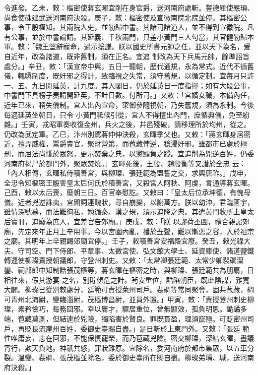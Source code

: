 \begin{pinyinscope}
 令進發。乙未，敕：樞密使蔣玄暉宜削在身官爵，送河南府處斬。豐德庫使應頊、尚食使硃建武送河南府決殺。庚子，敕：樞密使及宣徽南院北院並停。其樞密公事，令王殷權知。其兩院人吏，並勒歸中書。其諸司諸道人，並不得到宣徽院。凡有公事，並於中書論請。其延義、千秋兩門，只差小黃門三人勾當，其官健勒歸本軍。敕：「魏王堅辭寵命，過示捴謙。朕以國史所書元帥之任，並以天下為名，爰自近年，改為諸道，既非舊制，須在正名。宜追
 制改為天下兵馬元帥，餘準詔旨處分。」辛丑，敕：「漢宣帝中興，五日一聽朝，歷代通規，永為常式。近代不循舊儀，輒隳制度，既奸邪之得計，致臨視之失常，須守舊規，以循定制。宜每月只許一、五、九日開延英，計九度。其入閣日，仍於延英日一度指揮；如有大段公事，中書門下具榜子奏請開延英，不計日數。付所司。」又敕：「宮嬪女職，本備內任，近年已來，稍失儀制。宮人出內宣命，寀御參隨視朝，乃失舊規，須為永制。今後每遇延英坐朝日，只令
 小黃門祗候引從，宮人不得擅出內門，庶循典儀，免至紛雜。」壬寅，戎昭軍奏收復金州，兵火之後，井邑殘破，請移理所於均州，從之。仍改為武定軍。乙巳，汴州別駕蔣仲伸決殺，玄暉季父也。又敕：「蔣玄暉身居密近，擅弄威權，鬻爵賣官，聚財營第，而苞藏悖逆，稔浸奸邪。雖都市已處於極刑，而屈法尚慊於眾怒，更示焚棄之典，以懲顯負之蹤。宜追削為兇逆百姓，仍委河南府揭尸於都門外，聚眾焚燒。」玄暉死後，王殷、趙殷衡等又譖於全忠
 云：「內人相傳，玄暉私侍積善宮，與柳璨、張廷範為盟誓之交，求興唐祚。」戊申，全忠令知樞密王殷害皇太后何氏於積善宮，又殺宮人阿秋、阿虔，言通導蔣玄暉。己酉，敕以太后喪，廢朝三日。百官奉慰訖。又敕曰：「皇太后位承坤德，有愧母儀。近者兇逆誅夷，宮闈詞連醜狀，尋自崩變，以謝萬方。朕以幼沖，君臨區宇，雖情深號慕，而法難徇私，勉循秦、漢之規，須示追降之典。其遣黃門收所上皇太后寶冊，追廢為庶人，宜差官告郊廟。」庚戌，敕：「朕
 以謬荷丕圖，禮合親謁郊廟，先定來年正月上辛用事。今以宮圍內亂，播於丑聲，難以慚恧之容，入於祖宗之廟。其明年上辛親謁郊廟宜停。」壬子，敕積善宮安福殿宜廢。癸丑，敕光祿大夫、守司空、門下侍郎、平章事、太微宮使、弘文館大學士、延資庫使、諸道鹽鐵轉運使柳璨責授朝議郎，守登州刺史。又敕：「太常卿張廷範、太常少卿裴磵溫鑾、祠部郎中知制誥張茂樞等，蔣玄暉在樞密之時，與柳璨、張廷範共為朋扇，日相往來，假其游宴
 之名，別貯傾危之計。茍安重位，酷陷朝臣，既此陰謀，難寬大闢。柳璨已從別敕處分，廷範可責授萊州司戶。裴磵等常同聚會，固共苞藏，磵可青州北海尉，鑾臨淄尉，茂樞博昌尉，並員外置。」甲寅，敕：「責授登州刺史柳璨，素矜憸巧，每務回邪。幸以庸才，驟居重位，曾無顯效，孤負明恩。詭譎多端，苞藏莫測，但結連於兇險，獨陷害於賢良。罪既貫盈，理須竄殛。可貶密州司戶，再貶長流崖州百姓，委御史臺賜自盡。」是日斬於上東門外。又敕：「張廷
 範性唯庸妄，志在回邪，不能保慎寵榮，而乃苞藏兇險。密交柳璨，深結玄暉，晝議宵行，欺天負地。神祇共怒，罪狀難原。宜除名，委河南府於都市集眾，以五車分裂。溫鑾、裴磵、張茂樞並除名，委於御史臺所在賜自盡。柳璨弟瑀、瑊，送河南府決殺。」




\end{pinyinscope}
